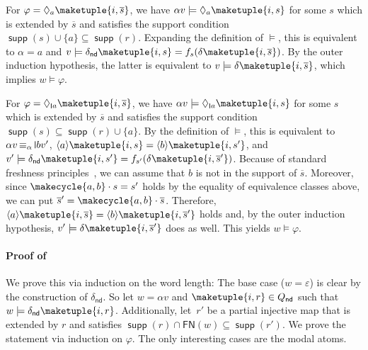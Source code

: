 \documentclass[10pt,a4paper]{amsart}
\theoremstyle{definition}
\newcommand{\seq}{\subseteq}
\newcommand{\op}[1]{\operatorname{\mathsf{#1}}}
\newcommand{\nd}{\op{nd}}
\DeclareMathOperator{\supp}{\mathsf{supp}}
\newcommand{\braket}[1]{\langle #1 \rangle}
\newcommand{\set}[1]{\{#1\}}
\DeclareMathOperator{\alphaequiv}{\equiv_{\alpha}}
\newcommand{\FN}{\mathsf{FN}}
\renewcommand{\vDash}{\models}
\newcommand{\midmid}{\hspace{0.2ex}{\rule[-0.1ex]{0.6pt}{1.65ex}}\hspace{0.2ex}}
\newcommand{\scriptmidmid}{\hspace{0.2ex}{\rule[-0.1ex]{0.6pt}{1.1ex}}\hspace{0.2ex}}
\newcommand{\newletter}[1]{{\midmid}#1}
\newcommand{\scriptnew}[1]{{\scriptmidmid}#1}
\begin{document}
    For $\varphi = \Diamond_a \maketuple{i, \overline{s}}$, we have
    $\alpha v \vDash \Diamond_a \maketuple{i, s}$ for some $s$ which is extended by $\overline{s}$ and
    satisfies the support condition $\supp(s) \cup \set{a} \seq \supp(r)$. Expanding the definition of
    $\vDash$, this is equivalent to $\alpha = a$ and $v \vDash \delta_{\nd}\maketuple{i, s} =
    f_s(\delta\maketuple{i, \overline{s}})$. By the outer induction hypothesis, the latter is equivalent to
    $v \vDash \delta\maketuple{i, \overline{s}}$, which implies $w \vDash \varphi$.

    For $\varphi = \Diamond_{\scriptnew{a}} \maketuple{i, \overline{s}}$, we have
    $\alpha v \vDash \Diamond_{\scriptnew{a}} \maketuple{i, s}$ for some $s$ which is extended by $\overline{s}$
    and satisfies the support condition $\supp(s) \seq \supp(r) \cup \set{a}$. By the definition of $\vDash$,
    this is equivalent to $\alpha v \alphaequiv \newletter{b}v'$, $\braket{a}\maketuple{i, s} = \braket{b}%
    \maketuple{i,s'}$, and $v' \vDash \delta_{\nd}\maketuple{i,s'} = f_{s'}(\delta\maketuple{i,\overline{s}'})$.
    Because of standard freshness principles~\cite{Pitts2013}, we can assume that $b$ is not in the support of $\overline{s}$. 
    Moreover, since $\makecycle{a,b} \cdot s = s'$ holds by the equality of equivalence classes above, we can put $\overline{s}' = \makecycle{a,b} \cdot \overline{s}$. 
    Therefore, $\braket{a}\maketuple{i,\overline{s}} = \braket{b}\maketuple{i,\overline{s}'}$ holds and, by the outer induction hypothesis, $v' \vDash \delta\maketuple{i,\overline{s}'}$ does as well. 
    This yields $w \vDash \varphi$.

\paragraph*{Proof of~}

  We prove this via induction on the word length: The base case ($w=\varepsilon$) is clear by the construction of $\delta_{\nd}$.
  So let $w = \alpha v$ and $\maketuple{i, r} \in Q_{\nd}$ such that $w \vDash \delta_{\nd}\maketuple{i, r}$.
  Additionally, let~$r'$ be a partial injective map that is extended by $r$ and satisfies $\supp(r) \cap \FN(w) \seq \supp(r')$.
  We prove the statement via induction on $\varphi$. The only interesting cases are the modal atoms.
\end{document}
